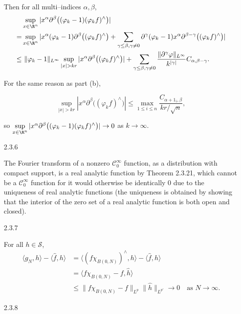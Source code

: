 \begin{itemize}
Then for all multi--indices $\alpha,\beta$,
\begin{align*}
    &\sup_{x\in\R^n} |x^\alpha\partial^\beta \big((\varphi_k-1)(\varphi_k f)^\wedge\big)|\\
    =&\sup_{x\in\R^n} |x^\alpha (\varphi_k-1)\partial^\beta\big((\varphi_k f)^\wedge\big)+
    \sum_{\gamma\leq\beta,\gamma\neq0} \partial^\gamma(\varphi_k-1)x^\alpha\partial^{\beta-\gamma}\big((\varphi_k f)^\wedge\big)|\\
    \leq&\ \|\varphi_k-1\|_{L^\infty}\sup_{|x|>kr}|x^\alpha\partial^\beta \big((\varphi_k f)^\wedge\big)|
    +\sum_{\gamma\leq\beta,\gamma\neq0}\frac{\|\partial^\gamma\varphi\|_{L^\infty}}{k^{|\gamma|}}C_{\alpha,\beta-\gamma}.
\end{align*}

For the same reason as part (b),

$$\sup_{|x|>kr} |x^\alpha\partial^\beta \big((\varphi_k f)^\wedge\big)|
\leq\max\limits_{1\leq i\leq n}\frac{C_{\alpha+1_i,\beta}}{kr/\sqrt{n}},$$

so $\sup\limits_{x\in\R^n} |x^\alpha \partial^\beta\big((\varphi_k-1)(\varphi_k f)^\wedge\big)|\rightarrow0$ as $k\rightarrow\infty$.

\item[2.3.6]

The Fourier transform of a nonzero $\mathscr{C}^\infty_0$ function, 
as a distribution with compact support, 
is a real analytic function by Theorem 2.3.21, 
which cannot be a $\mathscr{C}^\infty_0$ function 
for it would otherwise be identically $0$ 
due to the uniqueness of real analytic functions 
(the uniqueness is obtained by showing that the interior of the zero set 
of a real analytic function is both open and closed).

\item[2.3.7]

For all $h\in \mathscr{S}$,
\begin{align*}
    \langle g_N,h\rangle-\langle \hat{f},h\rangle
    &=\langle (f\chi_{B(0,N)})^\wedge,h\rangle-\langle \hat{f},h\rangle\\
    &=\langle f\chi_{B(0,N)}-f,\hat{h}\rangle\\
    &\leq\|f\chi_{B(0,N)}-f\|_{L^p}\|\hat{h}\|_{L^{p'}}
    \rightarrow 0 \quad \text{as } N\rightarrow\infty.
\end{align*}

\item[2.3.8]


\end{itemize}
